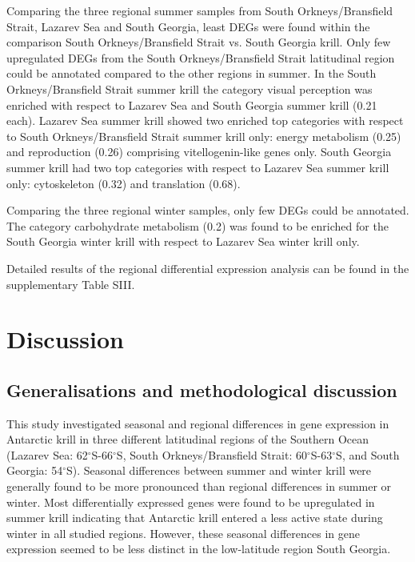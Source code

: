 Comparing the three regional summer samples from South Orkneys/Bransfield
Strait, Lazarev Sea and South Georgia, least DEGs were found within the
comparison South Orkneys/Bransfield Strait vs. South Georgia krill. Only few
upregulated DEGs from the South Orkneys/Bransfield Strait latitudinal region
could be annotated compared to the other regions in summer. In the South
Orkneys/Bransfield Strait summer krill the category visual perception was
enriched with respect to Lazarev Sea and South Georgia summer krill (0.21
each). Lazarev Sea summer krill showed two enriched top categories with respect
to South Orkneys/Bransfield Strait summer krill only: energy metabolism (0.25)
and reproduction (0.26) comprising vitellogenin-like genes only. South Georgia
summer krill had two top categories with respect to Lazarev Sea summer krill
only: cytoskeleton (0.32) and translation (0.68).

Comparing the three regional winter samples, only few DEGs could be annotated.
The category  carbohydrate metabolism (0.2) was found to be enriched for the
South Georgia winter krill with respect to Lazarev Sea winter krill only. 

Detailed  results of the regional differential expression analysis
can be found in the supplementary Table SIII.

\section{Discussion}

\subsection{Generalisations and methodological discussion}

This study investigated seasonal and regional differences in gene expression in
Antarctic krill in three different latitudinal regions of the Southern Ocean
(Lazarev Sea: 62$^{\circ}$S-66$^{\circ}$S, South Orkneys/Bransfield Strait:
60$^{\circ}$S-63$^{\circ}$S, and South Georgia: 54$^{\circ}$S). Seasonal
differences between summer and winter krill were generally found to be more
pronounced than regional differences in summer or winter. Most differentially
expressed genes were found to be upregulated in summer krill indicating that
Antarctic krill entered a less active state during winter in all studied
regions. However, these seasonal differences in gene expression seemed to be
less distinct in the low-latitude region South Georgia.

